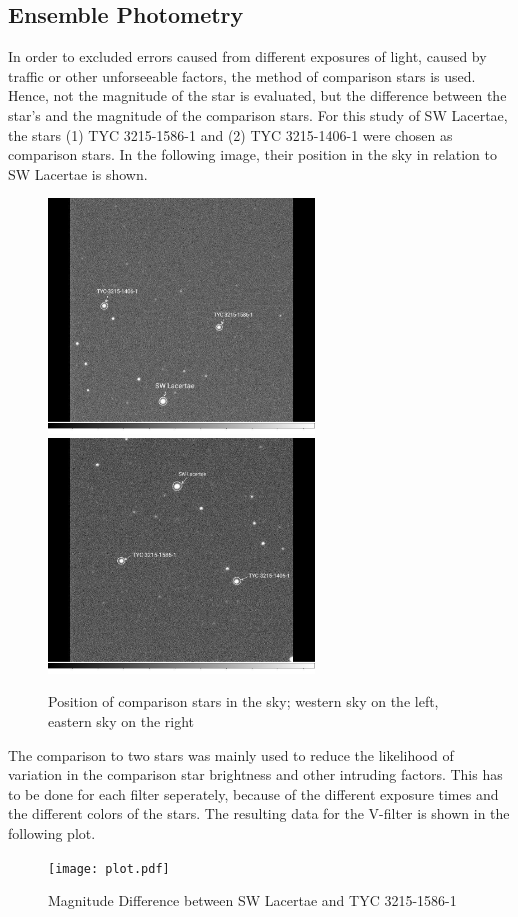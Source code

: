 \subsection{Ensemble Photometry}
  \label{sec:great}
  In order to excluded errors caused from different exposures of light, caused by traffic 
  or other unforseeable factors, the method of comparison stars is used. 
  Hence, not the magnitude of the star is evaluated, but the difference between the 
  star’s and the magnitude of the comparison stars. For this study of 
  SW Lacertae, the stars (1) TYC 3215-1586-1 and (2) TYC 3215-1406-1 were chosen as comparison stars. 
  In the following image, their position in the sky in relation to SW Lacertae
  is shown.
  \begin{figure}[H]
    \centering
    \includegraphics[width=200pt]{WestHA~2.jpg}
    \hspace{1em}
    \includegraphics[width=200pt]{EastHA~2.jpg}
    \caption{Position of comparison stars in the sky; western sky on the left, eastern sky on the right}
    \label{fig:plot}
  \end{figure}
  The comparison to two stars was mainly used to reduce the likelihood of 
  variation in the comparison star brightness and other intruding factors.
  This has to be done for each filter seperately, because of the different 
  exposure times and the different colors of the stars.
  The resulting data for the V-filter is shown in the following plot.
  \begin{figure}[H]
    \centering
    \texttt{[image: plot.pdf]}
    \caption{Magnitude Difference between SW Lacertae and TYC 3215-1586-1}
    \label{fig:plot}
  \end{figure}

